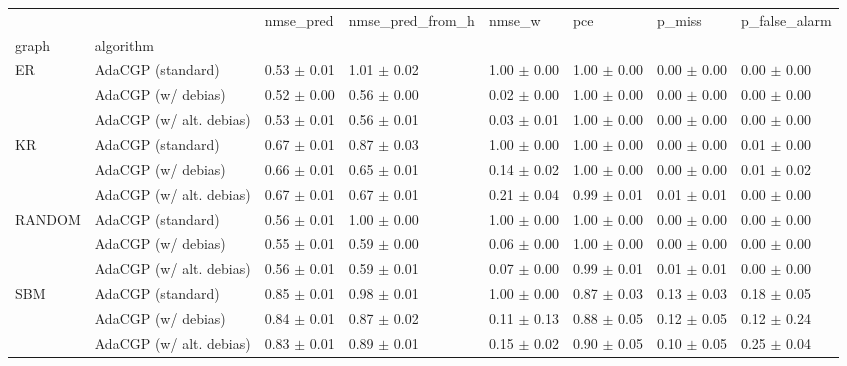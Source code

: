 \begin{tabular}{llllllll}
\toprule
    &                         &        nmse_pred & nmse_pred_from_h &           nmse_w &              pce &           p_miss &    p_false_alarm \\
graph & algorithm &                  &                  &                  &                  &                  &                  \\
\midrule
ER & AdaCGP (standard) &  0.53 $\pm$ 0.01 &  1.01 $\pm$ 0.02 &  1.00 $\pm$ 0.00 &  1.00 $\pm$ 0.00 &  0.00 $\pm$ 0.00 &  0.00 $\pm$ 0.00 \\
    & AdaCGP (w/ debias) &  0.52 $\pm$ 0.00 &  0.56 $\pm$ 0.00 &  0.02 $\pm$ 0.00 &  1.00 $\pm$ 0.00 &  0.00 $\pm$ 0.00 &  0.00 $\pm$ 0.00 \\
    & AdaCGP (w/ alt. debias) &  0.53 $\pm$ 0.01 &  0.56 $\pm$ 0.01 &  0.03 $\pm$ 0.01 &  1.00 $\pm$ 0.00 &  0.00 $\pm$ 0.00 &  0.00 $\pm$ 0.00 \\
KR & AdaCGP (standard) &  0.67 $\pm$ 0.01 &  0.87 $\pm$ 0.03 &  1.00 $\pm$ 0.00 &  1.00 $\pm$ 0.00 &  0.00 $\pm$ 0.00 &  0.01 $\pm$ 0.00 \\
    & AdaCGP (w/ debias) &  0.66 $\pm$ 0.01 &  0.65 $\pm$ 0.01 &  0.14 $\pm$ 0.02 &  1.00 $\pm$ 0.00 &  0.00 $\pm$ 0.00 &  0.01 $\pm$ 0.02 \\
    & AdaCGP (w/ alt. debias) &  0.67 $\pm$ 0.01 &  0.67 $\pm$ 0.01 &  0.21 $\pm$ 0.04 &  0.99 $\pm$ 0.01 &  0.01 $\pm$ 0.01 &  0.00 $\pm$ 0.00 \\
RANDOM & AdaCGP (standard) &  0.56 $\pm$ 0.01 &  1.00 $\pm$ 0.00 &  1.00 $\pm$ 0.00 &  1.00 $\pm$ 0.00 &  0.00 $\pm$ 0.00 &  0.00 $\pm$ 0.00 \\
    & AdaCGP (w/ debias) &  0.55 $\pm$ 0.01 &  0.59 $\pm$ 0.00 &  0.06 $\pm$ 0.00 &  1.00 $\pm$ 0.00 &  0.00 $\pm$ 0.00 &  0.00 $\pm$ 0.00 \\
    & AdaCGP (w/ alt. debias) &  0.56 $\pm$ 0.01 &  0.59 $\pm$ 0.01 &  0.07 $\pm$ 0.00 &  0.99 $\pm$ 0.01 &  0.01 $\pm$ 0.01 &  0.00 $\pm$ 0.00 \\
SBM & AdaCGP (standard) &  0.85 $\pm$ 0.01 &  0.98 $\pm$ 0.01 &  1.00 $\pm$ 0.00 &  0.87 $\pm$ 0.03 &  0.13 $\pm$ 0.03 &  0.18 $\pm$ 0.05 \\
    & AdaCGP (w/ debias) &  0.84 $\pm$ 0.01 &  0.87 $\pm$ 0.02 &  0.11 $\pm$ 0.13 &  0.88 $\pm$ 0.05 &  0.12 $\pm$ 0.05 &  0.12 $\pm$ 0.24 \\
    & AdaCGP (w/ alt. debias) &  0.83 $\pm$ 0.01 &  0.89 $\pm$ 0.01 &  0.15 $\pm$ 0.02 &  0.90 $\pm$ 0.05 &  0.10 $\pm$ 0.05 &  0.25 $\pm$ 0.04 \\
\bottomrule
\end{tabular}
